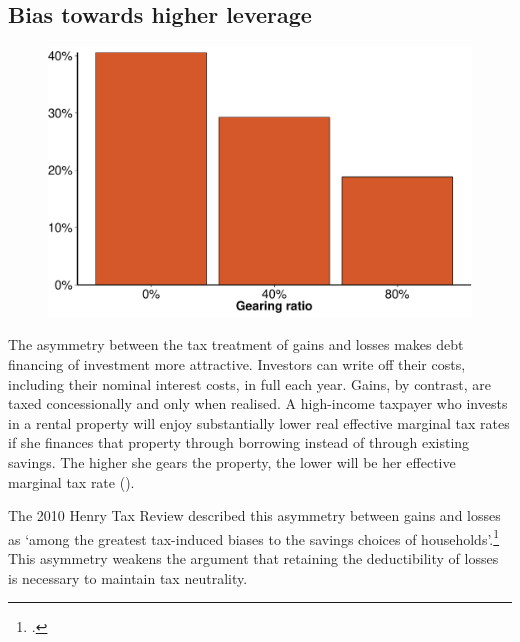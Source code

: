 \subsection{Bias towards higher leverage}
\begin{figure}[!t]
\label{fig:EMTR-by-gearing}

\includegraphics[width=\columnwidth]{CGT-NG-atlas//EMTR-by-gearing-1}

\end{figure}

The asymmetry between the tax treatment of gains and losses makes debt financing of investment more attractive. Investors can write off their costs, including their nominal interest costs, in full each year. 
Gains, by contrast, are taxed concessionally and only when realised. 
A high-income taxpayer who invests in a rental property will enjoy substantially lower real effective marginal tax rates if she finances that property through borrowing instead of through existing savings. The higher she gears the property, the lower will be her effective marginal tax rate (). 

The 2010 Henry Tax Review described this asymmetry between gains and losses as ‘among the greatest tax-induced biases to the savings choices of households’.\footcite[][69]{HenryTaxReview2010} This asymmetry weakens the argument that retaining the deductibility of losses is necessary to maintain tax neutrality.

